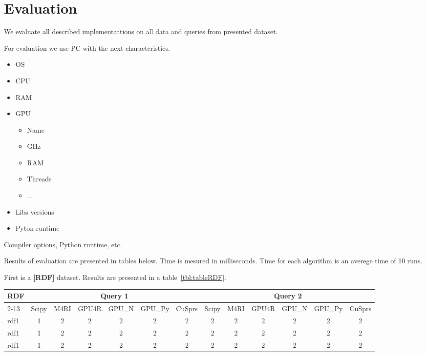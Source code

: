 \section{Evaluation}

We evaluate all described implementattions on all data and queries from presented dataset.

For evaluation we use PC with the next characteristics.
\begin{itemize}
  \item OS
  \item CPU
  \item RAM
  \item GPU
   \begin{itemize}
    \item Name
    \item GHz
    \item RAM
    \item Threads
    \item ...
   \end{itemize}
  \item Libs versions
  \item Pyton runtime
\end{itemize}

Compiler options, Python runtime, etc.

Results of evaluation are presented in tables below.
Time is mesured in milliseconds.
Time for each algorithm is an averege time of 10 runs.

First is a \textbf{[RDF]} dataset.
Results are presented in a table~\ref{tbl:tableRDF}.

\begin{table*}
\caption{RDFs querying results}
\label{tbl:tableRDF}
\begin{tabular}{| l | c | c | c | c | c | c | c | c | c | c | c | c |}
    \hline
    \multirow{2}{*}{RDF} & \multicolumn{6}{|c|}{Query 1}                               & \multicolumn{6}{|c|}{Query 2} \\
    \cline{2-13}
                         & Scipy & M4RI & GPU4R & GPU\_N & GPU\_Py & CuSprs & Scipy & M4RI & GPU4R & GPU\_N & GPU\_Py & CuSprs \\
    \hline
    \hline
    rdf1 & 1 & 2 & 2& 2& 2& 2& 2& 2& 2& 2& 2& 2\\
    rdf1 & 1 & 2 & 2& 2& 2& 2& 2& 2& 2& 2& 2& 2\\
    rdf1 & 1 & 2 & 2& 2& 2& 2& 2& 2& 2& 2& 2& 2\\
    \hline
  \end{tabular}
\end{table*}


